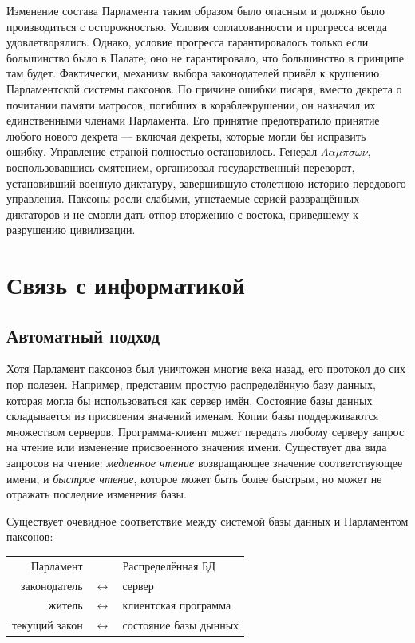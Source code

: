 \documentclass[12pt, a4paper]{article} %
\begin{document}
Изменение состава Парламента таким образом было опасным и должно было производиться с осторожностью. Условия согласованности и прогресса всегда удовлетворялись. Однако, условие прогресса гарантировалось только если большинство было в Палате; оно не гарантировало, что большинство  в принципе там будет. Фактически, механизм выбора законодателей привёл к крушению Парламентской системы паксонов. По причине ошибки писаря, вместо декрета о почитании памяти матросов, погибших в кораблекрушении, он назначил их единственными членами Парламента. Его принятие предотвратило принятие любого нового декрета --- включая декреты, которые могли бы исправить ошибку. Управление страной полностью остановилось. Генерал $\Lambda\alpha\mu\pi\sigma\omega\nu$, воспользовавшись смятением, организовал государственный переворот, установивший военную диктатуру, завершившую столетнюю историю передового управления. Паксоны росли слабыми, угнетаемые серией развращённых диктаторов и не смогли дать отпор вторжению с востока, приведшему к разрушению цивилизации.

\section{Связь с информатикой}\label{sec:csconnection}

\subsection{Автоматный подход}

Хотя Парламент паксонов был уничтожен многие века назад, его протокол до сих пор полезен. Например, представим простую распределённую базу данных, которая могла бы использоваться как сервер имён. Состояние базы данных складывается из присвоения значений именам. Копии базы поддерживаются множеством серверов. Программа-клиент может передать любому серверу запрос на чтение или изменение присвоенного значения имени. Существует два вида запросов на чтение: \textit{медленное чтение} возвращающее значение соответствующее имени, и \textit{быстрое чтение}, которое может быть более быстрым, но может не отражать последние изменения базы.

Существует очевидное соответствие между системой базы данных и Парламентом паксонов:
\begin{table}[h]
\begin{center}
\begin{tabular}{rcl}
    Парламент&&Распределённая БД\\
    законодатель&$\leftrightarrow$&сервер\\
    житель&$\leftrightarrow$&клиентская программа\\
    текущий закон&$\leftrightarrow$&состояние базы дынных\\
\end{tabular}
\end{center}
\end{table}
\end{document}
